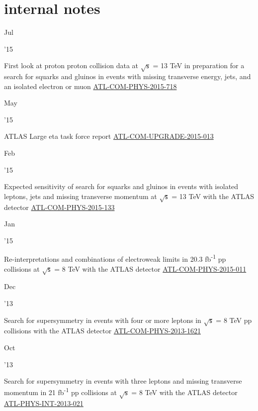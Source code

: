 \documentclass[]{cv} %
\begin{document}
\ifinternalNotes
\section{internal notes}

\begin{entrylist}

  \entry
  {\parbox[t]{\parboxWidthOne}{Jul}\parbox[t]{\parboxWidthTwo}{\hfill '15}}
  {First look at proton proton collision data at $\sqrt{\mathsf{s}}$ = 13 TeV in
  preparation for a search for squarks and gluinos in events with missing
  transverse energy, jets, and an isolated electron or muon}
{\href{https://cds.cern.ch/record/2034389}{ATL-COM-PHYS-2015-718}}
{\vspace*{\spacingPubs}}

  \entry
  {\parbox[t]{\parboxWidthOne}{May}\parbox[t]{\parboxWidthTwo}{\hfill '15}}
  {ATLAS Large eta task force report}
{\href{https://cds.cern.ch/record/2016324}{ATL-COM-UPGRADE-2015-013}}
{\vspace*{\spacingPubs}}

  \entry
  {\parbox[t]{\parboxWidthOne}{Feb}\parbox[t]{\parboxWidthTwo}{\hfill '15}}
  {Expected sensitivity of search for squarks and gluinos in events with
    isolated leptons, jets and missing transverse momentum at
    $\sqrt{\mathsf{s}}$ = 13 TeV with the ATLAS detector}
{\href{https://cds.cern.ch/record/1994195}{ATL-COM-PHYS-2015-133}}
{\vspace*{\spacingPubs}}

  \entry
  {\parbox[t]{\parboxWidthOne}{Jan}\parbox[t]{\parboxWidthTwo}{\hfill '15}}
  {Re-interpretations and combinations of electroweak limits in
    20.3 fb\textsuperscript{-1} pp collisions at $\sqrt{\mathsf{s}}$
  = 8 TeV with the ATLAS detector}
{\href{https://cds.cern.ch/record/1981548}{ATL-COM-PHYS-2015-011}}
{\vspace*{\spacingPubs}}

  \entry
  {\parbox[t]{\parboxWidthOne}{Dec}\parbox[t]{\parboxWidthTwo}{\hfill '13}}
  {Search for supersymmetry in events with four or more leptons in $\sqrt{\mathsf{s}}$ = 8 TeV pp collisions with the ATLAS
detector}
{\href{https://cds.cern.ch/record/1635455}{ATL-COM-PHYS-2013-1621}}
{\vspace*{\spacingPubs}}

\entry
{\parbox[t]{\parboxWidthOne}{Oct}\parbox[t]{\parboxWidthTwo}{\hfill '13}}
{Search for supersymmetry in events with three leptons and missing transverse momentum in 21 fb\textsuperscript{-1} pp collisions
at $\sqrt{\mathsf{s}}$ = 8 TeV with the ATLAS detector}
{\href{https://cds.cern.ch/record/1610185}{ATL-PHYS-INT-2013-021}}
{\vspace*{\spacingPubs}}


\end{entrylist}
\end{document}
